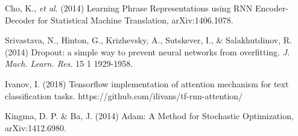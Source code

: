 \documentclass{article} %
\begin{document}
{\begin{thebibliography}{9}
 Cho, K., \textit{et al}. (2014) Learning Phrase Representations using RNN Encoder-Decoder for Statistical Machine Translation, arXiv:1406.1078.

 Srivastava, N., Hinton, G., Krizhevsky, A., Sutskever, I., \& Salakhutdinov, R. (2014) Dropout: a simple way to prevent neural networks from overfitting. \textit{J. Mach. Learn. Res.} 15 1 1929-1958.

Ivanov, I. (2018) Tensorflow implementation of attention mechanism for text classification tasks. https://github.com/ilivans/tf-rnn-attention/

 Kingma, D. P. \& Ba, J. (2014) Adam: A Method for Stochastic Optimization, arXiv:1412.6980.

\end{thebibliography}
}
\end{document}
